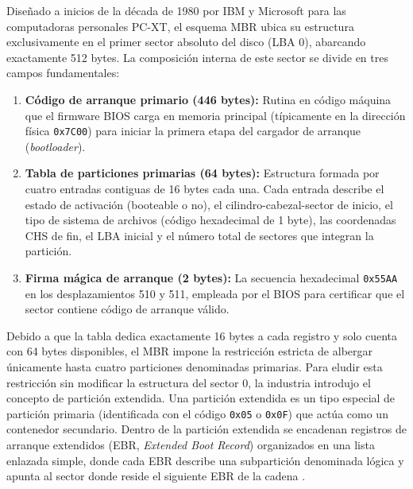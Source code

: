 \documentclass[12pt]{article}
\begin{document}
Diseñado a inicios de la década de 1980 por IBM y Microsoft para las computadoras personales PC-XT, el esquema MBR ubica su estructura exclusivamente en el primer sector absoluto del disco (LBA 0), abarcando exactamente 512 bytes. La composición interna de este sector se divide en tres campos fundamentales:
\begin{enumerate}[noitemsep, topsep=2pt]
    \item \textbf{Código de arranque primario (446 bytes):} Rutina en código máquina que el firmware BIOS carga en memoria principal (típicamente en la dirección física \texttt{0x7C00}) para iniciar la primera etapa del cargador de arranque (\textit{bootloader}).
    \item \textbf{Tabla de particiones primarias (64 bytes):} Estructura formada por cuatro entradas contiguas de 16 bytes cada una. Cada entrada describe el estado de activación (booteable o no), el cilindro-cabezal-sector de inicio, el tipo de sistema de archivos (código hexadecimal de 1 byte), las coordenadas CHS de fin, el LBA inicial y el número total de sectores que integran la partición.
    \item \textbf{Firma mágica de arranque (2 bytes):} La secuencia hexadecimal \texttt{0x55AA} en los desplazamientos 510 y 511, empleada por el BIOS para certificar que el sector contiene código de arranque válido.
\end{enumerate}

Debido a que la tabla dedica exactamente 16 bytes a cada registro y solo cuenta con 64 bytes disponibles, el MBR impone la restricción estricta de albergar únicamente hasta cuatro particiones denominadas primarias. Para eludir esta restricción sin modificar la estructura del sector 0, la industria introdujo el concepto de partición extendida. Una partición extendida es un tipo especial de partición primaria (identificada con el código \texttt{0x05} o \texttt{0x0F}) que actúa como un contenedor secundario. Dentro de la partición extendida se encadenan registros de arranque extendidos (EBR, \textit{Extended Boot Record}) organizados en una lista enlazada simple, donde cada EBR describe una subpartición denominada lógica y apunta al sector donde reside el siguiente EBR de la cadena \parencite[\S 7.4, pp.\ 377--378]{carretero2001sistemas}.
\end{document}
